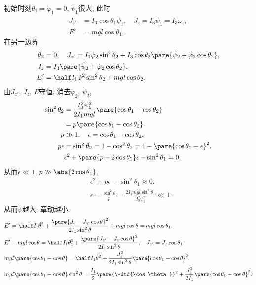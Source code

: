 \documentclass[../LectureNotes.tex]{subfiles}
\begin{document}
初始时刻$\dot\theta_1 = \dot\varphi_1 = 0$, $\dot\psi_1$很大, 此时
\begin{align*}
    J_{z'} &= I_3\cos\theta_1\dot\psi_1,\quad J_z = I_3\dot\psi_1 = I_3\omega_z, \\
    E' &= mgl\cos\theta_1.
\end{align*}
在另一边界
\begin{align*}
    \dot\theta_2 &= 0, \quad J_{z'} = I_1\dot\varphi_2\sin^2\theta_2 + I_3\cos\theta_2\pare{\dot\psi_2 + \dot\varphi_2\cos\theta_2}, \\
    J_z &= I_3\pare{\dot\psi_2 + \dot\varphi_2 \cos\theta_2}, \\
    E' &= \half I_1\dot\varphi^2\sin^2\theta_2 + mgl\cos\theta_2.
\end{align*}
由$J_{z'}$, $J_z$, $E$守恒, 消去$\dot\varphi_2$, $\dot\psi_2$,
\begin{align*}
    \sin^2\theta_2 &= \frac{I_3^2\psi_1^2}{2I_1mgl}\pare{\cos\theta_1 - \cos\theta_2} \\
    &= p\pare{\cos\theta_1 - \cos\theta_2}. \\
    p &\gg 1,\quad \epsilon = \cos\theta_1 - \cos\theta_2, \\
    p\epsilon &= \sin^2\theta_2 = 1-\cos^2\theta_2 = 1-\pare{\cos\theta_1 - \epsilon}^2. \\
    & \epsilon^2 + \pare{p - 2\cos\theta_1} \epsilon -\sin^2\theta_1 = 0.
\end{align*}
从而$\epsilon \ll 1$, $p \gg \abs{2\cos\theta_1}$,
\begin{align*}
    & \epsilon^2 + p\epsilon - \sin^2\theta_1 \approx 0. \\
    & \epsilon = \frac{\sin^2\theta}{p} = \frac{2I_1mgl\sin^2\theta_1}{I_3^2\psi_1^2} \ll 1.
\end{align*}
从而$\dot\psi$越大, 章动越小.
\begin{align*}
    & E' = \half I_1\dot\theta^2 + \frac{\pare{J_z - J_{z'}\cos\theta}^2}{2I_1\sin^2\theta} + mgl\cos\theta = mgl\cos\theta_1. \\
    & E' - mgl\cos\theta = \half I_1\dot\theta_1^2 + \frac{\pare{J_{z'}-J_z\cos\theta}^2}{2I_1\sin^2\theta},\quad J_{z'} = J_z\cos\theta_1. \\
    & mgl\pare{\cos\theta_1 - \cos\theta} = \half I_1\dot\theta^2 + \frac{J_z^2}{2I_1\sin^2\theta}\pare{\cos\theta_1 - \cos\theta}^2. \\
    & mgl\pare{\cos\theta_1 - \cos\theta} \sin^2\theta = \frac{I_1}{2} \pare{\+dtd{\cos\theta}}^2 + \frac{J_z^2}{2I_1}\pare{\cos\theta_1 - \cos\theta}^2.
\end{align*}
\end{document}
